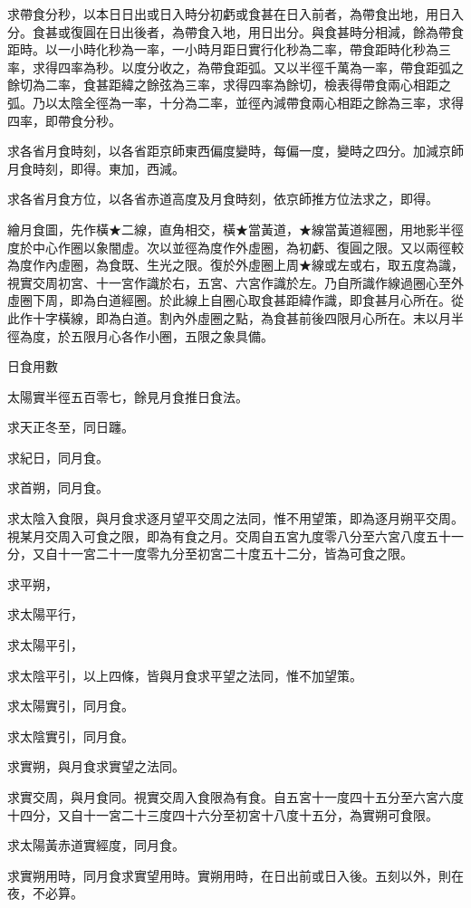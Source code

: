 \begin{pinyinscope}
求帶食分秒，以本日日出或日入時分初虧或食甚在日入前者，為帶食出地，用日入分。食甚或復圓在日出後者，為帶食入地，用日出分。與食甚時分相減，餘為帶食距時。以一小時化秒為一率，一小時月距日實行化秒為二率，帶食距時化秒為三率，求得四率為秒。以度分收之，為帶食距弧。又以半徑千萬為一率，帶食距弧之餘切為二率，食甚距緯之餘弦為三率，求得四率為餘切，檢表得帶食兩心相距之弧。乃以太陰全徑為一率，十分為二率，並徑內減帶食兩心相距之餘為三率，求得四率，即帶食分秒。

求各省月食時刻，以各省距京師東西偏度變時，每偏一度，變時之四分。加減京師月食時刻，即得。東加，西減。

求各省月食方位，以各省赤道高度及月食時刻，依京師推方位法求之，即得。

繪月食圖，先作橫★二線，直角相交，橫★當黃道，★線當黃道經圈，用地影半徑度於中心作圈以象闇虛。次以並徑為度作外虛圈，為初虧、復圓之限。又以兩徑較為度作內虛圈，為食既、生光之限。復於外虛圈上周★線或左或右，取五度為識，視實交周初宮、十一宮作識於右，五宮、六宮作識於左。乃自所識作線過圈心至外虛圈下周，即為白道經圈。於此線上自圈心取食甚距緯作識，即食甚月心所在。從此作十字橫線，即為白道。割內外虛圈之點，為食甚前後四限月心所在。末以月半徑為度，於五限月心各作小圈，五限之象具備。

日食用數

太陽實半徑五百零七，餘見月食推日食法。

求天正冬至，同日躔。

求紀日，同月食。

求首朔，同月食。

求太陰入食限，與月食求逐月望平交周之法同，惟不用望策，即為逐月朔平交周。視某月交周入可食之限，即為有食之月。交周自五宮九度零八分至六宮八度五十一分，又自十一宮二十一度零九分至初宮二十度五十二分，皆為可食之限。

求平朔，

求太陽平行，

求太陽平引，

求太陰平引，以上四條，皆與月食求平望之法同，惟不加望策。

求太陽實引，同月食。

求太陰實引，同月食。

求實朔，與月食求實望之法同。

求實交周，與月食同。視實交周入食限為有食。自五宮十一度四十五分至六宮六度十四分，又自十一宮二十三度四十六分至初宮十八度十五分，為實朔可食限。

求太陽黃赤道實經度，同月食。

求實朔用時，同月食求實望用時。實朔用時，在日出前或日入後。五刻以外，則在夜，不必算。


\end{pinyinscope}
